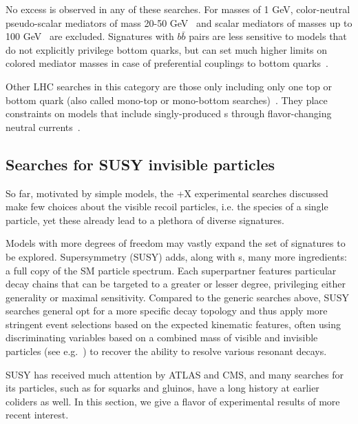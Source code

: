No excess is observed in any of these searches. 
For \IP masses of 1 GeV, color-neutral pseudo-scalar mediators of mass 20-50 GeV~\cite{Aaboud:2017aeu} and scalar mediators of masses up to 100 GeV~\cite{Sirunyan:2017leh} are excluded. 
Signatures with $b\bar{b}$ pairs are less sensitive to models that do not explicitly privilege bottom quarks, but can set much higher limits on colored mediator masses in case of preferential couplings to bottom quarks~\cite{Agrawal:2014una}. 

Other LHC searches in this category are those only including only one top or bottom quark (also called mono-top or mono-bottom searches)~\cite{Sirunyan:2018gka, Aad:2014wza}.
They place constraints on models that include singly-produced {\IP}s through flavor-changing neutral currents~\cite{Boucheneb:2014wza}.

\subsection{Searches for SUSY invisible particles}
\label{sec:results_SUSYSearches}

So far, motivated by simple models, the \MET+X experimental searches discussed make few choices about the visible recoil particles, i.e. the species of a single particle, yet these already lead to a plethora of diverse signatures.

Models with more degrees of freedom may vastly expand the set of signatures to be explored.
Supersymmetry (SUSY) adds, along with {\IP}s, many more ingredients: a full copy of the SM particle spectrum.
Each superpartner features particular decay chains that can be targeted to a greater or lesser degree, privileging either generality or maximal sensitivity. 
Compared to the generic searches above, SUSY searches general opt for a more specific decay topology and thus apply more stringent event selections based on the expected kinematic features, often using discriminating variables based on a combined mass of visible and invisible particles (see e.g.~\cite{Lester:1999tx}) to recover the ability to resolve various resonant decays.

SUSY has received much attention by ATLAS and CMS, and many searches for its particles, such as for squarks and gluinos, have a long history at earlier coliders as well.
In this section, we give a flavor of experimental results of more recent interest.

